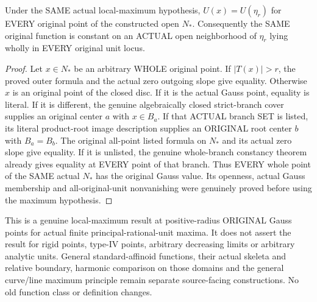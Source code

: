 \begin{theorem}
\label{analytic:actual-original-unit-max-gauss-local-constancy}
\leanok
{}
Under the SAME actual local-maximum hypothesis, $U(x)=U(\eta_r)$ for
EVERY original point of the constructed open $N_*$. Consequently the SAME
original function is constant on an ACTUAL open neighborhood of $\eta_r$
lying wholly in EVERY original unit locus.
\end{theorem}
\begin{proof}
Let $x\in N_*$ be an arbitrary WHOLE original point. If $|T(x)|>r$,
the proved outer formula and the actual zero outgoing slope give equality.
Otherwise $x$ is an original point of the closed disc. If it is the actual
Gauss point, equality is literal. If it is different, the genuine
algebraically closed strict-branch cover supplies an original center $a$
with $x\in B_a$. If that ACTUAL branch SET is listed, its literal
product-root image description supplies an ORIGINAL root center $b$
with $B_a=B_b$. The original all-point listed formula on $N_*$ and its
actual zero slope give equality. If it is unlisted, the genuine whole-branch
constancy theorem already gives equality at EVERY point of that branch.
Thus EVERY whole point of the SAME actual $N_*$ has the original Gauss
value. Its openness, actual Gauss membership and all-original-unit
nonvanishing were genuinely proved before using the maximum hypothesis.
\end{proof}

\begin{remark}
This is a genuine local-maximum result at positive-radius ORIGINAL Gauss
points for actual finite principal-rational-unit maxima. It does not
assert the result for rigid points, type-IV points, arbitrary decreasing
limits or arbitrary analytic units. General standard-affinoid functions,
their actual skeleta and relative boundary, harmonic comparison on those
domains and the general curve/line maximum principle remain separate
source-facing constructions. No old function class or definition changes.
\end{remark}

